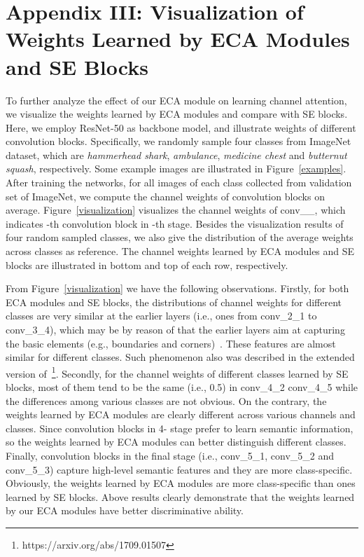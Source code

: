 \documentclass[10pt,twocolumn,letterpaper]{article}
\begin{document}
\section*{Appendix III: Visualization of Weights Learned by ECA Modules and SE Blocks}
To further analyze the effect of our ECA module on learning channel attention, we visualize the weights learned by ECA modules and compare with SE blocks. Here, we employ ResNet-50 as backbone model, and illustrate weights of different convolution blocks. Specifically, we randomly sample four classes from ImageNet dataset, which are \textit{hammerhead shark}, \textit{ambulance}, \textit{medicine chest} and \textit{butternut squash}, respectively. Some example images are illustrated in Figure~\ref{examples}. After training the networks, for all images of each class collected from validation set of ImageNet, we compute the  channel weights of convolution blocks on average. Figure~\ref{visualization} visualizes the channel weights of conv\_\_, which  indicates -th convolution block in -th stage. Besides the visualization results of four random sampled classes, we also give the distribution of the average weights across  classes as reference. The channel weights learned by ECA modules and SE blocks are illustrated in bottom and top of each row, respectively.

From Figure~\ref{visualization} we have the following observations. Firstly, for both ECA modules and SE blocks, the distributions of channel weights for different classes are very similar at the earlier layers (i.e., ones from conv\_2\_1 to conv\_3\_4), which may be by reason of that the earlier layers aim at capturing the basic elements (e.g., boundaries and corners)~\cite{DBLP:conf/eccv/ZeilerF14}. These features are almost similar for different classes. Such phenomenon also was described in the extended version of~\cite{SENet18}\footnote{https://arxiv.org/abs/1709.01507}. Secondly, for the channel weights of different classes learned by SE blocks, most of them tend to be the same (i.e., 0.5) in conv\_4\_2  conv\_4\_5  while the differences among various classes are not obvious. On the contrary, the weights learned by ECA modules are clearly different across various channels and classes. Since convolution blocks in 4- stage prefer to learn semantic information, so the weights learned by ECA modules can better distinguish different classes. Finally, convolution blocks in the final stage (i.e., conv\_5\_1, conv\_5\_2 and conv\_5\_3) capture high-level semantic features and they are more class-specific. Obviously, the weights learned by ECA modules are more class-specific than ones learned by SE blocks. Above results clearly demonstrate that the weights learned by our ECA modules have better discriminative ability.
\end{document}
